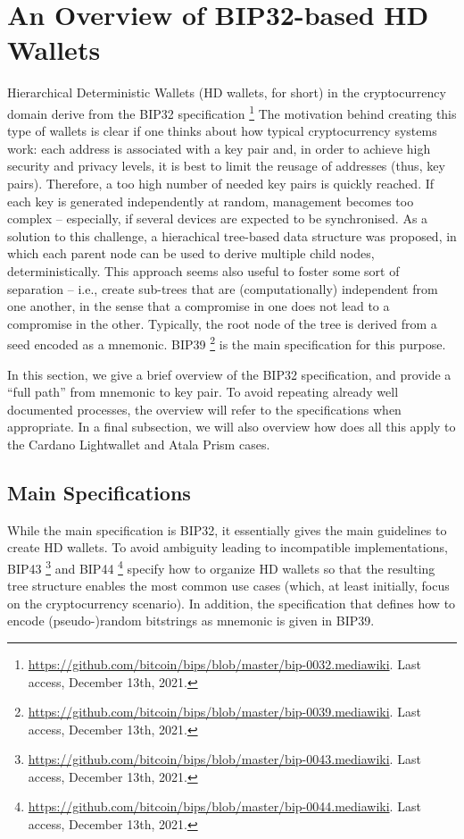 \section{An Overview of BIP32-based HD Wallets}
\label{sec:bip32}

Hierarchical Deterministic Wallets (HD wallets, for short) in the cryptocurrency
domain derive from the BIP32 specification%
\footnote{\url{https://github.com/bitcoin/bips/blob/master/bip-0032.mediawiki}.
  Last access, December 13th, 2021.}
The motivation behind creating this type of wallets is clear if one thinks about
how typical cryptocurrency systems work: each address is associated with a key
pair and, in order to achieve high security and privacy levels, it is best to
limit the reusage of addresses (thus, key pairs). Therefore, a too high number
of needed key pairs is quickly reached. If each key is generated independently
at random, management becomes too complex -- especially, if several devices
are expected to be synchronised. As a solution to this challenge, a hierachical
tree-based data structure was proposed, in which each parent node can be used to
derive multiple child nodes, deterministically. This approach seems also useful
to foster some sort of separation -- i.e., create sub-trees that are
(computationally) independent from one another, in the sense that a compromise
in one does not lead to a compromise in the other. Typically, the root node
of the tree is derived from a seed encoded as a mnemonic. BIP39%
\footnote{\url{https://github.com/bitcoin/bips/blob/master/bip-0039.mediawiki}.
  Last access, December 13th, 2021.} is the main specification for this purpose.

In this section, we give a brief overview of the BIP32 specification, and
provide a ``full path'' from mnemonic to key pair. To avoid repeating already
well documented processes, the overview will refer to the specifications when
appropriate.
%
In a final subsection, we will also overview how does all this apply to the
Cardano Lightwallet and Atala Prism cases.

\subsection{Main Specifications}

While the main specification is BIP32, it essentially gives the main guidelines
to create HD wallets. To avoid ambiguity leading to incompatible
implementations, BIP43%
\footnote{\url{https://github.com/bitcoin/bips/blob/master/bip-0043.mediawiki}.
  Last access, December 13th, 2021.} and BIP44%
\footnote{\url{https://github.com/bitcoin/bips/blob/master/bip-0044.mediawiki}.
  Last access, December 13th, 2021.} specify how to organize HD wallets so
that the resulting tree structure enables the most common use cases (which, at
least initially, focus on the cryptocurrency scenario). In addition, the
specification that defines how to encode (pseudo-)random bitstrings as
mnemonic is given in BIP39.

